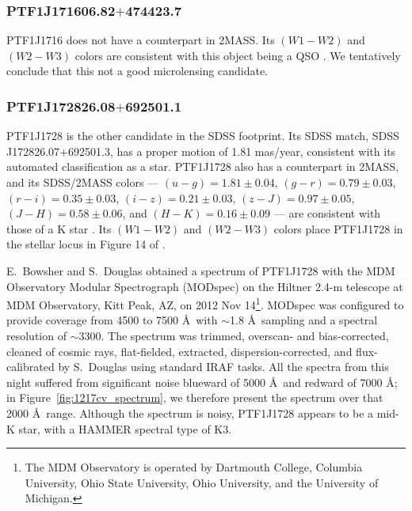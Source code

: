\documentclass{emulateapj}
\begin{document}
\subsubsection*{PTF1J171606.82$+$474423.7} %
PTF1J1716 does not have a counterpart in 2MASS. Its $(W1-W2)$ and $(W2-W3)$ colors are consistent with this object being a QSO \citep[cf.\ Figure 14 in][]{yan2013}. We tentatively conclude that this not a good microlensing candidate. 

\subsubsection*{PTF1J172826.08$+$692501.1} %
PTF1J1728 is the other candidate in the SDSS footprint. Its SDSS match, SDSS J172826.07$+$692501.3, has a proper motion of 1.81 mas/year, consistent with its automated classification as a star. PTF1J1728 also has a counterpart in 2MASS, and its SDSS/2MASS colors --- $(u-g) = 1.81\pm0.04$, $(g-r) = 0.79\pm 0.03$, $(r-i) = 0.35\pm0.03$, $(i-z) = 0.21\pm0.03$, $(z-J) = 0.97 \pm0.05$, $(J-H) = 0.58\pm0.06$, and $(H-K) = 0.16\pm 0.09$ --- are consistent with those of a K star \citep{kev07}. Its $(W1-W2)$ and $(W2-W3)$ colors place PTF1J1728 in the stellar locus in Figure 14 of \citet[][]{yan2013}. 

E.~Bowsher and S.~Douglas obtained a spectrum of PTF1J1728 with the MDM Observatory Modular Spectrograph (MODspec) on the Hiltner 2.4-m telescope at MDM Observatory, Kitt Peak, AZ, on 2012 Nov 14\footnote{The MDM Observatory is operated by Dartmouth College, Columbia University, Ohio State University, Ohio University, and the University of Michigan.}. MODspec was configured to provide coverage from 4500 to 7500 \AA~with $\sim$1.8 \AA~sampling and a spectral resolution of $\sim$3300. The spectrum was trimmed, overscan- and bias-corrected, cleaned of cosmic rays, flat-fielded, extracted, dispersion-corrected, and flux-calibrated by S.~Douglas using standard IRAF tasks. All the spectra from this night suffered from significant noise blueward of 5000 \AA~and redward of 7000 \AA; in  Figure~\ref{fig:1217cv_spectrum}, we therefore present the spectrum over that 2000 \AA~range. Although the spectrum is noisy, PTF1J1728 appears to be a mid-K star, with a HAMMER spectral type of K3.
\end{document}
